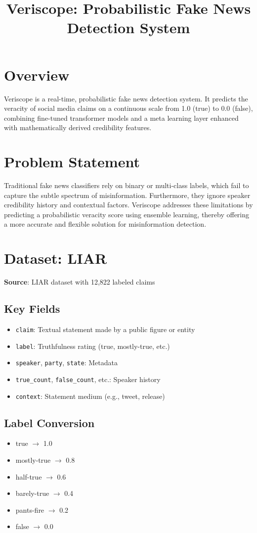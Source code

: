 \documentclass{article}
\title{Veriscope: Probabilistic Fake News Detection System}
\author{}
\date{}
\begin{document}
\maketitle

\section*{Overview}
Veriscope is a real-time, probabilistic fake news detection system. It predicts the veracity of social media claims on a continuous scale from 1.0 (true) to 0.0 (false), combining fine-tuned transformer models and a meta learning layer enhanced with mathematically derived credibility features.

\section*{Problem Statement}
Traditional fake news classifiers rely on binary or multi-class labels, which fail to capture the subtle spectrum of misinformation. Furthermore, they ignore speaker credibility history and contextual factors. Veriscope addresses these limitations by predicting a probabilistic veracity score using ensemble learning, thereby offering a more accurate and flexible solution for misinformation detection.

\section*{Dataset: LIAR}
\textbf{Source}: LIAR dataset with 12,822 labeled claims

\subsection*{Key Fields}
\begin{itemize}
  \item \texttt{claim}: Textual statement made by a public figure or entity
  \item \texttt{label}: Truthfulness rating (true, mostly-true, etc.)
  \item \texttt{speaker}, \texttt{party}, \texttt{state}: Metadata
  \item \texttt{true\_count}, \texttt{false\_count}, etc.: Speaker history
  \item \texttt{context}: Statement medium (e.g., tweet, release)
\end{itemize}

\subsection*{Label Conversion}
\begin{itemize}
  \item true $\rightarrow$ 1.0
  \item mostly-true $\rightarrow$ 0.8
  \item half-true $\rightarrow$ 0.6
  \item barely-true $\rightarrow$ 0.4
  \item pants-fire $\rightarrow$ 0.2
  \item false $\rightarrow$ 0.0
\end{itemize}
\end{document}
